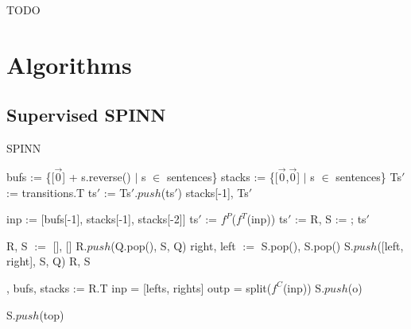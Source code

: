 \documentclass[11pt,a4paper]{article}
\begin{document}
TODO

%
%



\newpage

\appendix

\section{Algorithms}
\label{sec:algos}

\subsection{Supervised SPINN}
\label{sec:algos-spinn}

\begin{algorithm}[H]
\caption{SPINN}\label{spinn}
\begin{algorithmic}[1]

\State bufs := \{[$\vec{0}$] + s.reverse() $\vert$ s $\in$ sentences\}
\State stacks := \{[$\vec{0}$,$\vec{0}$] $\vert$ s $\in$ sentences\}
\State Ts$'$ := transitions.T
 \State ts$'$ := 
 \State Ts$'.push$(ts$'$)
 \EndFor
 \State \Return stacks[-1], Ts$'$
 \EndFunction

\State inp := [bufs[-1], stacks[-1], stacks[-2]]
\State ts$'$ := $f^P$($f^T$(inp))
\State ts$'$ := 
\State R, S := 
\State {}; 
\State \Return ts$'$
\EndFunction

\State R, S $:= $ [], []
\State R$.push$(Q.pop(), S, Q)
\State right, left $:=$ S.pop(), S.pop()
\State S.$push$([left, right], S, Q)
\EndIf
\EndFor
\State \Return R, S
\EndFunction

, bufs, stacks := R.T
\State inp = [lefts, rights]
\State outp = split($f^C$(inp))
\State S$.push$(o)
\EndFor
\EndFunction

\State S$.push$(top)
\EndFor
\EndFunction

\end{algorithmic}
\end{algorithm}
\end{document}
